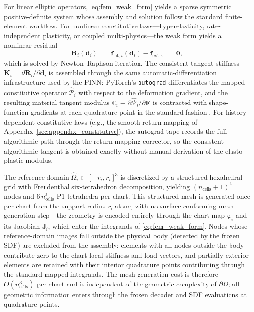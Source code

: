 \documentclass[sort&compress]{svjour3} %
\begin{document}
For linear elliptic operators, \eqref{eq:fem_weak_form} yields a sparse symmetric positive-definite system whose assembly and solution follow the standard finite-element workflow. For nonlinear constitutive laws---hyperelasticity, rate-independent plasticity, or coupled multi-physics---the weak form yields a nonlinear residual
\begin{equation}
\mathbf{R}_i(\mathbf{d}_i) \;=\; \mathbf{f}_{\mathrm{int},i}(\mathbf{d}_i) - \mathbf{f}_{\mathrm{ext},i} \;=\; \mathbf{0},
\label{eq:fem_residual}
\end{equation}
which is solved by Newton--Raphson iteration. The consistent tangent stiffness $\mathbf{K}_i = \partial\mathbf{R}_i/\partial\mathbf{d}_i$ is assembled through the same automatic-differentiation infrastructure used by the PINN: PyTorch's \texttt{autograd} differentiates the mapped constitutive operator $\widehat{\mathcal{P}}_i$ with respect to the deformation gradient, and the resulting material tangent modulus $\mathbb{C}_i = \partial\widehat{\mathcal{P}}_i/\partial\mathbf{F}$ is contracted with shape-function gradients at each quadrature point in the standard fashion \citep{simo_computational_1998,de_souza_neto_computational_2011}. For history-dependent constitutive laws (e.g., the smooth return mapping of Appendix~\ref{sec:appendix_constitutive}), the autograd tape records the full algorithmic path through the return-mapping corrector, so the consistent algorithmic tangent is obtained exactly without manual derivation of the elasto-plastic modulus.

The reference domain $\widehat{\Omega}_i \subset [-r_i, r_i]^3$ is discretized by a structured hexahedral grid with Freudenthal six-tetrahedron decomposition, yielding $(n_{\mathrm{cells}}+1)^3$ nodes and $6\,n_{\mathrm{cells}}^3$ P1 tetrahedra per chart. This structured mesh is generated once per chart from the support radius $r_i$ alone, with no surface-conforming mesh generation step---the geometry is encoded entirely through the chart map $\varphi_i$ and its Jacobian $\mathbf{J}_i$, which enter the integrands of \eqref{eq:fem_weak_form}. Nodes whose reference-domain images fall outside the physical body (detected by the frozen SDF) are excluded from the assembly: elements with all nodes outside the body contribute zero to the chart-local stiffness and load vectors, and partially exterior elements are retained with their interior quadrature points contributing through the standard mapped integrands. The mesh generation cost is therefore $O(n_{\mathrm{cells}}^3)$ per chart and is independent of the geometric complexity of $\partial\Omega$; all geometric information enters through the frozen decoder and SDF evaluations at quadrature points.
\end{document}
